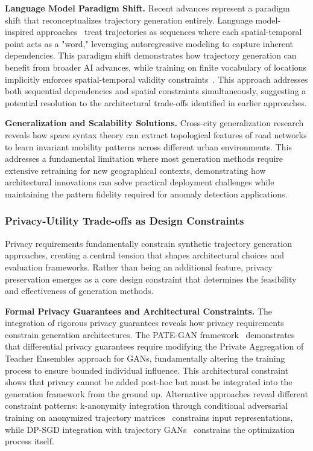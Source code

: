 \documentclass[runningheads]{llncs}
\begin{document}
\textbf{Language Model Paradigm Shift.} Recent advances represent a paradigm shift that reconceptualizes trajectory generation entirely. Language model-inspired approaches~\cite{zhang2025end} treat trajectories as sequences where each spatial-temporal point acts as a "word," leveraging autoregressive modeling to capture inherent dependencies. This paradigm shift demonstrates how trajectory generation can benefit from broader AI advances, while training on finite vocabulary of locations implicitly enforces spatial-temporal validity constraints~\cite{kong2023mobility}. This approach addresses both sequential dependencies and spatial constraints simultaneously, suggesting a potential resolution to the architectural trade-offs identified in earlier approaches.

\textbf{Generalization and Scalability Solutions.} Cross-city generalization research~\cite{wang2025gtg} reveals how space syntax theory can extract topological features of road networks to learn invariant mobility patterns across different urban environments. This addresses a fundamental limitation where most generation methods require extensive retraining for new geographical contexts, demonstrating how architectural innovations can solve practical deployment challenges while maintaining the pattern fidelity required for anomaly detection applications.

\subsubsection{Privacy-Utility Trade-offs as Design Constraints}

Privacy requirements fundamentally constrain synthetic trajectory generation approaches, creating a central tension that shapes architectural choices and evaluation frameworks. Rather than being an additional feature, privacy preservation emerges as a core design constraint that determines the feasibility and effectiveness of generation methods.

\textbf{Formal Privacy Guarantees and Architectural Constraints.} The integration of rigorous privacy guarantees reveals how privacy requirements constrain generation architectures. The PATE-GAN framework~\cite{jordon2019pate} demonstrates that differential privacy guarantees require modifying the Private Aggregation of Teacher Ensembles approach for GANs, fundamentally altering the training process to ensure bounded individual influence. This architectural constraint shows that privacy cannot be added post-hoc but must be integrated into the generation framework from the ground up. Alternative approaches reveal different constraint patterns: k-anonymity integration through conditional adversarial training on anonymized trajectory matrices~\cite{rao2023cats} constrains input representations, while DP-SGD integration with trajectory GANs~\cite{merhi2024synthetic} constrains the optimization process itself.
\end{document}
